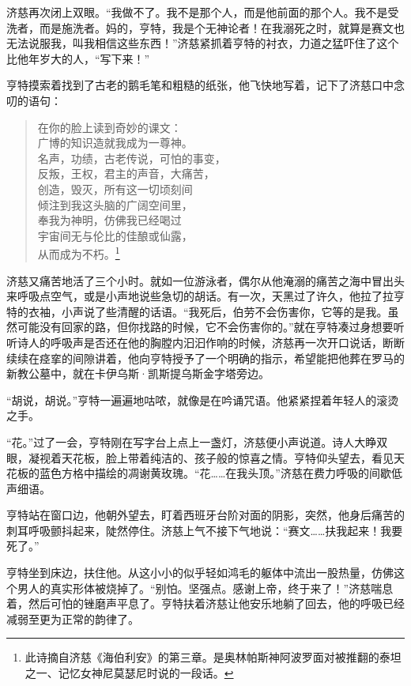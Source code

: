 \documentclass[AutoFakeBold=true]{book}
\begin{document}
济慈再次闭上双眼。``我做不了。我不是那个人，而是他前面的那个人。我不是受洗者，而是施洗者。妈的，亨特，我是个无神论者！在我溺死之时，就算是赛文也无法说服我，叫我相信这些东西！''济慈紧抓着亨特的衬衣，力道之猛吓住了这个比他年岁大的人，``写下来！''

亨特摸索着找到了古老的鹅毛笔和粗糙的纸张，他飞快地写着，记下了济慈口中念叨的语句：

\begin{quote}
	{\kaishu 在你的脸上读到奇妙的课文：\\
	广博的知识造就我成为一尊神。\\
	名声，功绩，古老传说，可怕的事变，\\
	反叛，王权，君主的声音，大痛苦，\\
	创造，毁灭，所有这一切顷刻间\\
	倾注到我这头脑的广阔空间里，\\
	奉我为神明，仿佛我已经喝过\\
	宇宙间无与伦比的佳酿或仙露，\\
	从而成为不朽。}\footnote{此诗摘自济慈《海伯利安》的第三章。是奥林帕斯神阿波罗面对被推翻的泰坦之一、记忆女神尼莫瑟尼时说的一段话。}
\end{quote}

济慈又痛苦地活了三个小时。就如一位游泳者，偶尔从他淹溺的痛苦之海中冒出头来呼吸点空气，或是小声地说些急切的胡话。有一次，天黑过了许久，他拉了拉亨特的衣袖，小声说了些清醒的话语。``我死后，伯劳不会伤害你，它等的是我。虽然可能没有回家的路，但你找路的时候，它不会伤害你的。''就在亨特凑过身想要听听诗人的呼吸声是否还在他的胸膛内汩汩作响的时候，济慈再一次开口说话，断断续续在痉挛的间隙讲着，他向亨特授予了一个明确的指示，希望能把他葬在罗马的新教公墓中，就在卡伊乌斯·凯斯提乌斯金字塔旁边。

``胡说，胡说。''亨特一遍遍地咕哝，就像是在吟诵咒语。他紧紧捏着年轻人的滚烫之手。

``花。''过了一会，亨特刚在写字台上点上一盏灯，济慈便小声说道。诗人大睁双眼，凝视着天花板，脸上带着纯洁的、孩子般的惊喜之情。亨特仰头望去，看见天花板的蓝色方格中描绘的凋谢黄玫瑰。``花……在我头顶。''济慈在费力呼吸的间歇低声细语。

亨特站在窗口边，他朝外望去，盯着西班牙台阶对面的阴影，突然，他身后痛苦的刺耳呼吸颤抖起来，陡然停住。济慈上气不接下气地说：``赛文……扶我起来！我要死了。''

亨特坐到床边，扶住他。从这小小的似乎轻如鸿毛的躯体中流出一股热量，仿佛这个男人的真实形体被烧掉了。``别怕。坚强点。感谢上帝，终于来了！''济慈喘息着，然后可怕的锉磨声平息了。亨特扶着济慈让他安乐地躺了回去，他的呼吸已经减弱至更为正常的韵律了。
\end{document}

